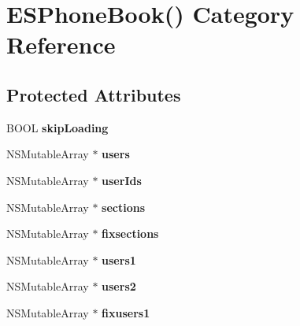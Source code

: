 \hypertarget{category_e_s_phone_book_07_08}{}\section{E\+S\+Phone\+Book() Category Reference}
\label{category_e_s_phone_book_07_08}
\subsection*{Protected Attributes}
\begin{DoxyCompactItemize}
\item 
\hypertarget{category_e_s_phone_book_07_08_a937553544da2c44c029e307bc6cc826f}{}B\+O\+O\+L {\bfseries skip\+Loading}\label{category_e_s_phone_book_07_08_a937553544da2c44c029e307bc6cc826f}

\item 
\hypertarget{category_e_s_phone_book_07_08_a40bb73d5ae64eeb628f938abd59aac17}{}N\+S\+Mutable\+Array $\ast$ {\bfseries users}\label{category_e_s_phone_book_07_08_a40bb73d5ae64eeb628f938abd59aac17}

\item 
\hypertarget{category_e_s_phone_book_07_08_a7e4202ca429c798e7f9263ec0439b23c}{}N\+S\+Mutable\+Array $\ast$ {\bfseries user\+Ids}\label{category_e_s_phone_book_07_08_a7e4202ca429c798e7f9263ec0439b23c}

\item 
\hypertarget{category_e_s_phone_book_07_08_aa1517ea3bc1a5603fb7549c73b2863cf}{}N\+S\+Mutable\+Array $\ast$ {\bfseries sections}\label{category_e_s_phone_book_07_08_aa1517ea3bc1a5603fb7549c73b2863cf}

\item 
\hypertarget{category_e_s_phone_book_07_08_a3a60946c370f40248ec9e2911ee88753}{}N\+S\+Mutable\+Array $\ast$ {\bfseries fixsections}\label{category_e_s_phone_book_07_08_a3a60946c370f40248ec9e2911ee88753}

\item 
\hypertarget{category_e_s_phone_book_07_08_a961f13ebcccd929448398d150777e826}{}N\+S\+Mutable\+Array $\ast$ {\bfseries users1}\label{category_e_s_phone_book_07_08_a961f13ebcccd929448398d150777e826}

\item 
\hypertarget{category_e_s_phone_book_07_08_a5ec14940dd9901c93a875cb052388191}{}N\+S\+Mutable\+Array $\ast$ {\bfseries users2}\label{category_e_s_phone_book_07_08_a5ec14940dd9901c93a875cb052388191}

\item 
\hypertarget{category_e_s_phone_book_07_08_ade77ba10e6fb4f28e1d79ad6d0e68ee9}{}N\+S\+Mutable\+Array $\ast$ {\bfseries fixusers1}\label{category_e_s_phone_book_07_08_ade77ba10e6fb4f28e1d79ad6d0e68ee9}


\end{DoxyCompactItemize}
